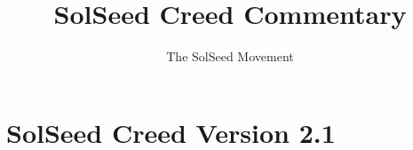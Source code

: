 \documentclass[ebook,12pt,openany,twoside]{memoir}
\begin{document}
\title{\textbf{SolSeed Creed Commentary}}
\author{The SolSeed Movement}
\begin{titlingpage}
\maketitle
\end{titlingpage}


\cleartorecto
\thispagestyle{cleared}

\pagestyle{plain}






\chapter{SolSeed Creed Version 2.1}
\end{document}
